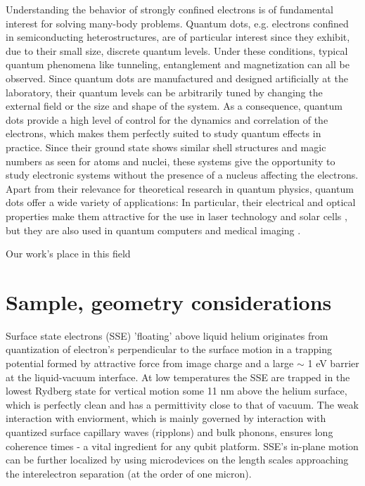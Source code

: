 \documentclass[twocolumn,superscriptaddress,unsortedaddress,
 amsmath,amssymb,
 aps,
]{revtex4-2}
\begin{document}
Understanding the behavior of strongly confined electrons is of fundamental
interest for solving many-body problems.  Quantum dots, e.g. electrons
confined in semiconducting heterostructures, are of particular interest since
they exhibit, due to their small size, discrete quantum levels.  Under these
conditions, typical quantum phenomena like tunneling, entanglement and
magnetization can all be observed.   Since quantum
dots are manufactured and designed artificially at the laboratory, their
quantum levels can be arbitrarily tuned by changing the external field or the
size and shape of the system.  As a consequence, quantum dots provide a high
level of control for the dynamics and correlation of the electrons, which
makes them perfectly suited to study quantum effects in practice.  Since their
ground state shows similar shell structures and magic numbers as seen for
atoms and nuclei, these systems give the opportunity to
study electronic systems without the presence of a nucleus affecting the
electrons.  Apart from their relevance for theoretical research in quantum
physics, quantum dots offer a wide variety of applications: In particular,
their electrical and optical properties make them attractive for the use in
laser technology \cite{strauf2010,5075760} and solar cells
\cite{jenks:013111,doi:10.1021/cr900289f}, but they are also used in quantum
computers\cite{PhysRevA.57.120} and medical imaging \cite{Ben-Ari02042003}.


Our work's place in this field


\section{Sample, geometry considerations} %
Surface state electrons (SSE) 'floating' above liquid helium originates from quantization of electron's perpendicular to the surface motion in a trapping potential formed by attractive force from image charge and a large $\sim$ 1 eV barrier at the liquid-vacuum interface. At low temperatures the SSE are trapped in the lowest Rydberg state for vertical motion some 11 nm above the helium surface, which is perfectly clean and has a permittivity close to that of vacuum. The weak interaction with enviorment, which is mainly governed by interaction with quantized surface capillary waves (ripplons) and bulk phonons, ensures long coherence times - a vital ingredient for any qubit platform. SSE's in-plane motion can be further localized by using microdevices on the length scales approaching the interelectron separation (at the order of one micron). 
\end{document}
